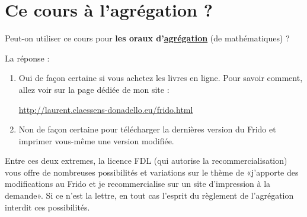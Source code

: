 
\section*{Ce cours à l'agrégation ?}

Peut-on utiliser ce cours pour \textbf{les oraux d'\href{http://agreg.org/}{agrégation}} (de mathématiques) ?

La réponse :
\begin{enumerate}
    \item
        Oui de façon certaine si vous achetez les livres en ligne. Pour savoir comment, allez voir sur la page dédiée de mon site :
        \begin{center}
            \url{http://laurent.claessens-donadello.eu/frido.html}
        \end{center}
    \item
        Non de façon certaine pour télécharger la dernières version du Frido et imprimer vous-même une version modifiée.
\end{enumerate}
Entre ces deux extremes, la licence FDL (qui autorise la recommercialisation) vous offre de nombreuses possibilités et variations sur le thème de «j'apporte des modifications au Frido et je recommercialise sur un site d'impression à la demande». Si ce n'est la lettre, en tout cas l'esprit du règlement de l'agrégation interdit ces possibilités.
